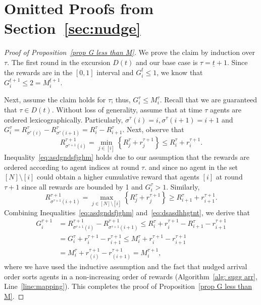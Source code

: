 \section{Omitted Proofs from Section~\ref{sec:nudge}}\label{appendix:nudge}

\begin{proof}[Proof of Proposition~\ref{prop G less than M}]
We prove the claim by induction over $\tau$. The first round in the excursion $D(t)$ and our base case is $\tau=\underline{t}+1$. Since the rewards are in the $[0,1]$ interval and $G_i^{\underline{t}} \leq 1$, we know that $G_i^{\underline{t}+1} \leq 2 = M_i^{\underline{t}+1}$. 



Next, assume the claim holds for $\tau$; thus, $G_i^\tau \leq M_i^\tau$. Recall that we are guaranteed that $\tau \in D(t)$. Without loss of generality, assume that at time $\tau$ agents are ordered lexicographically. Particularly,  ${\sigma^\tau(i)}=i,{\sigma^\tau(i+1)}=i+1$  and $G_i^\tau = R^\tau_{\sigma^\tau(i)}- R^\tau_{\sigma^\tau(i+1)}= R^\tau_i- R^\tau_{i+1}$. 
Next, observe that 
\begin{equation}\label{eq:asdgndsfjghm}
    R^{\tau+1}_{\sigma^{\tau+1}(i)} = \min_{j\in [i]}\left\{ 
    R^{\tau}_{j}+r^{\tau+1}_{j} 
    \right\}\leq R^{\tau}_{i}+r^{\tau+1}_{i}.
\end{equation}
Inequality~\eqref{eq:asdgndsfjghm} holds due to our assumption that the rewards are ordered according to agent indices at round $\tau$.  and since no agent in the set $[N]\setminus[i]$ could obtain a higher cumulative reward that agents $[i]$ at round $\tau + 1$ since all rewards are bounded by 1 and $G^\tau_i > 1$. Similarly,
\begin{equation}\label{eq:dsasdhhgtnt}
    R^{\tau+1}_{\sigma^{\tau+1}(i+1)} = \max_{j\in [N]\setminus[i]}\left\{ 
    R^{\tau}_{j}+r^{\tau+1}_{j} 
    \right\}\geq R^{\tau}_{i+1}+r^{\tau+1}_{i+1}.
\end{equation}
Combining Inequalities~\eqref{eq:asdgndsfjghm} and~\eqref{eq:dsasdhhgtnt}, we derive that
\begin{align*}
G_i^{\tau+1} &= R^{\tau+1}_{\sigma^{\tau+1}(i)} - R^{\tau+1}_{\sigma^{\tau+1}(i+1)} \leq R^{\tau}_{i}+r^{\tau+1}_{i} - R^{\tau}_{i+1}-r^{\tau+1}_{i+1} \\
& =G_i^\tau + r^{\tau+1}_{i} - r^{\tau+1}_{i+1} \leq M_i^\tau + r^{\tau+1}_{i} - r^{\tau+1}_{i+1} \\
&= M_i^\tau + r^{\tau+1}_{(i)} - r^{\tau+1}_{(i+1)} = M_i^{\tau+1},
\end{align*}
where we have used the inductive assumption and the fact that nudged arrival order sorts agents in a non-increasing order of rewards (Algorithm~\ref{alg: sugg arr}, Line~\ref{line:mapping}). This completes the proof of Proposition~\ref{prop G less than M}.
\end{proof}





